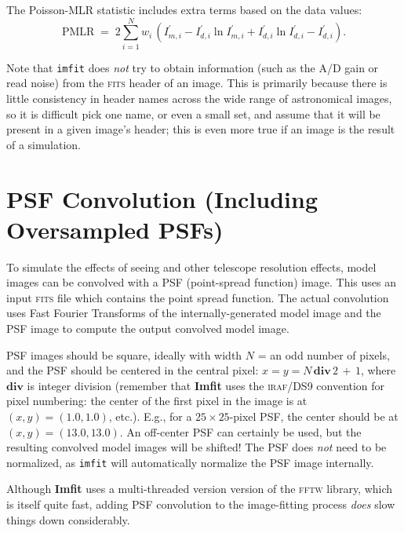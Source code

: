 \documentclass[10pt,a4paper,article]{memoir}
\newcommand{\imfit}{\textbf{Imfit}}
\newcommand{\imfitprog}{\texttt{imfit}}
\newcommand{\pmlr}{PMLR}
\begin{document}
The Poisson-MLR statistic includes extra terms based on the data values:
\begin{equation}
\mathrm{\pmlr} \; = \;  2 \sum_{i = 1}^{N} w_{i} \, 
\left( I^{\prime}_{m, i} - I^{\prime}_{d, i} \ln I^{\prime}_{m, i} + I^{\prime}_{d, i} \ln I^{\prime}_{d, i} - I^{\prime}_{d, i} \right).
\end{equation}

\medskip

Note that \imfitprog{} does \textit{not} try to obtain information (such as
the A/D gain or read noise) from the \textsc{fits} header of an image. This is primarily
because there is little consistency in header names across the wide range of
astronomical images, so it is difficult pick one name, or even a small set, and
assume that it will be present in a given image's header; this is even more
true if an image is the result of a simulation.




\section{PSF Convolution (Including Oversampled PSFs)}

To simulate the effects of seeing and other telescope resolution effects, model
images can be convolved with a PSF (point-spread function) image. This uses an
input \textsc{fits} file which contains the point spread function. The actual convolution
uses Fast Fourier Transforms of the internally-generated model image and the PSF
image to compute the output convolved model image.

PSF images should be square, ideally with width $N$ = an odd number of
pixels, and the PSF should be centered in the central pixel: $x = y = N \,
\mathbf{div} \, 2 \, + \, 1$, where $\mathbf{div}$ is integer division (remember
that \imfit{} uses the \textsc{iraf}/DS9 convention for pixel numbering: the center
of the first pixel in the image is at $(x,y) = (1.0,1.0)$, etc.).
E.g., for a $25 \times 25$-pixel PSF, the center should be at $(x,y) =
(13.0,13.0)$. An off-center PSF can certainly be used, but the resulting
convolved model images will be shifted! The PSF does \textit{not} need
to be normalized, as \imfitprog{} will automatically normalize the PSF
image internally.

Although \imfit{} uses a multi-threaded version version of the
\textsc{fftw} library, which is itself quite fast, adding PSF
convolution to the image-fitting process \textit{does} slow things down
considerably.
\end{document}
